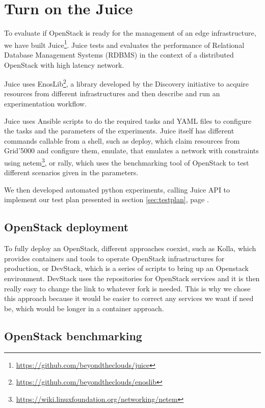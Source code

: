 \section{Turn on the Juice}


To evaluate if OpenStack is ready for the management of an edge infrastructure, we have built Juice\footnote{\url{https://github.com/beyondtheclouds/juice}}. Juice tests and evaluates the performance of Relational Database Management Systems (RDBMS) in the context of a distributed OpenStack with high latency network.

Juice uses EnosLib\footnote{\url{https://github.com/beyondtheclouds/enoslib}}, a library developed by the Discovery initiative to acquire resources from different infrastructures and then describe and run an experimentation workflow.

Juice uses Ansible scripts to do the required tasks and YAML files to configure the tasks and the parameters of the experiments. Juice itself has different commands callable from a shell, such as deploy, which claim resources from Grid'5000 and configure them, emulate, that emulates a network with constraints using netem\footnote{\url{https://wiki.linuxfoundation.org/networking/netem}}, or rally, which uses the benchmarking tool of OpenStack to test different scenarios given in the parameters.

We then developed automated python experiments, calling Juice API to implement our test plan presented in section \ref{sec:testplan}, page \pageref{sec:testplan}.

\subsection{OpenStack deployment}

To fully deploy an OpenStack, different approaches coexist, such as Kolla, which provides containers and tools to operate OpenStack infrastructures for production, or DevStack, which is a series of scripts to bring up an Openstack environment. DevStack uses the repositories for OpenStack services and it is then really easy to change the link to whatever fork is needed. This is why we chose this approach because it would be easier to correct any services we want if need be, which would be longer in a container approach.




\subsection{OpenStack benchmarking}


